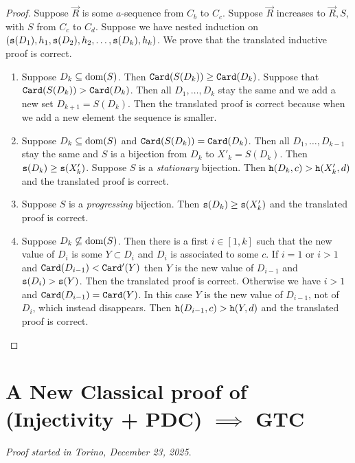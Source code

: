 \documentclass{lmcs}
\begin{document}
\begin{proof}
Suppose $\vec{R}$ is some $a$-sequence from $C_b$ to $C_c$. 
Suppose $\vec{R}$ increases to  $\vec{R},S$, with $S$ from $C_c$ to $C_d$.
Suppose we have nested induction on 
$({\tt s}(D_1),h_1,{\tt s}(D_2),h_2, \ldots, {\tt s}(D_k),h_k)$. We prove 
that the translated inductive proof is correct. 

\begin{enumerate}
\item
Suppose $D_k \subseteq {\rm dom}(S)$. Then ${\tt Card}(S(D_k)) \ge {\tt Card}(D_k)$.
Suppose  that ${\tt Card}(S(D_k)) > {\tt Card}(D_k)$.
Then all $D_1, \ldots, D_k$ stay the same and we add a new set $D_{k+1} = S(D_k)$. 
Then the translated proof is correct because when we add a new element the sequence
is smaller.

\item
Suppose $D_k \subseteq {\rm dom}(S)$ and ${\tt Card}(S(D_k)) = {\tt Card}(D_k)$.
Then all $D_1, \ldots, D_{k-1}$ stay the same and $S$ is a bijection 
from $D_k$ to $X'_k=S(D_k)$. Then ${\tt s}(D_k) \ge {\tt s}(X'_k)$.
Suppose $S$ is a \emph{stationary} bijection. Then ${\tt h}(D_k,c) > {\tt h}(X'_k,d)$
and the translated proof is correct.

\item
Suppose  $S$ is a \emph{progressing} bijection. Then ${\tt s}(D_k) \ge {\tt s}(X'_k)$ 
and the translated proof is correct.

\item
Suppose $D_k \not \subseteq {\rm dom}(S)$. Then there is a first $i \in [1,k]$ such that the new value 
of $D_i$ is some $Y \subset D_i$ and $D_i$ is associated to some $c$. 
If $i=1$ or $i>1$ and ${\tt Card}(D_{i-1}) <  {\tt Card}'(Y)$
then $Y$ is the new value of $D_{i-1}$ and ${\tt s}(D_i) > {\tt s}(Y)$. 
Then the translated proof is correct.
Otherwise we have $i>1$ and  ${\tt Card}(D_{i-1}) =  {\tt Card}(Y)$. In this case
$Y$ is the new value of $D_{i-1}$, not of $D_i$, which instead disappears.
Then ${\tt h}(D_{i-1},c) > {\tt h}(Y,d)$ and the translated proof is correct.
\end{enumerate}
\end{proof}

\newpage

\section{A New Classical proof of (Injectivity + PDC) $\implies$ GTC}
\label{section-classical-proof-PDC-implies-GTC}
\emph{Proof started in Torino, December 23, 2025}. 
\\
\end{document}
